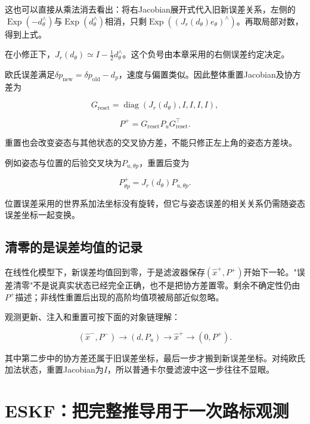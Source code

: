 这也可以直接从乘法消去看出：将右Jacobian展开式代入旧新误差关系，左侧的$\mathop{\mathrm{Exp}}(-d_\theta^\wedge)$与$\mathop{\mathrm{Exp}}(d_\theta^\wedge)$相消，只剩$\mathop{\mathrm{Exp}}((J_r(d_\theta)e_\theta)^\wedge)$。再取局部对数，得到上式。

在小修正下，$J_r(d_\theta)\simeq I-\frac12d_\theta^\wedge$。这个负号由本章采用的右侧误差约定决定。

欧氏误差满足$\delta p_{\mathrm{new}}=\delta p_{\mathrm{old}}-d_p$，速度与偏置类似。因此整体重置Jacobian及协方差为

\begin{equation*}
G_{\mathrm{reset}}=\operatorname{diag}(J_r(d_\theta),I,I,I,I),
\end{equation*}

\begin{equation*}
\boxed{P^+=G_{\mathrm{reset}}P_uG_{\mathrm{reset}}^\top.}
\end{equation*}

重置也会改变姿态与其他状态的交叉协方差，不能只修正左上角的姿态方差块。

例如姿态与位置的后验交叉块为$P_{u,\theta p}$，重置后变为

\begin{equation*}
P^+_{\theta p}=J_r(d_\theta)P_{u,\theta p}.
\end{equation*}

位置误差采用的世界系加法坐标没有旋转，但它与姿态误差的相关关系仍需随姿态误差坐标一起变换。

\subsection{清零的是误差均值的记录}

在线性化模型下，新误差均值回到零，于是滤波器保存$(\hat x^+,P^+)$开始下一轮。"误差清零"不是说真实状态已经完全正确，也不是把协方差置零。剩余不确定性仍由$P^+$描述；非线性重置后出现的高阶均值项被局部近似忽略。

观测更新、注入和重置可按下面的对象链理解：

\begin{equation*}
(\hat x^-,P^-)
 \longrightarrow(d,P_u)
 \longrightarrow\hat x^+
 \longrightarrow(0,P^+).
\end{equation*}

其中第二步中的协方差还属于旧误差坐标，最后一步才搬到新误差坐标。对纯欧氏加法状态，重置Jacobian为$I$，所以普通卡尔曼滤波中这一步往往不显眼。

\section{ESKF：把完整推导用于一次路标观测}

